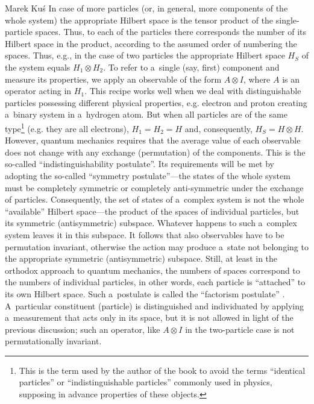\begin{newrevengenv}{Marek Kuś}
In case of more particles (or, in general, more components of the whole system) the appropriate Hilbert space is the tensor product of the single-particle spaces. Thus, to each of the particles there corresponds the number of its Hilbert space in the product, according to the assumed order of numbering the spaces. Thus, e.g., in the case of two particles the appropriate Hilbert space $H_S$ of the system equals $H_1 \otimes H_2$. To refer to a~single (say, first) component and measure its properties, we apply an observable of the form $A \otimes I$, where $A$ is an operator acting in $H_1$. This recipe works well when we deal with distinguishable particles possessing different physical properties, e.g. electron and proton creating a~binary system in a~hydrogen atom. But when all particles are of the same type\footnote{This is the term used by the author of the book to avoid the terms ``identical particles'' or ``indistinguishable particles'' commonly used in physics, supposing in advance properties of these objects.} (e.g. they are all electrons), $H_1 = H_2 = H$ and, consequently, $H_S  = H \otimes H$. However, quantum mechanics requires that the average value of each observable does not change with any exchange (permutation) of the components. This is the so-called ``indistinguishability postulate''. Its requirements will be met by adopting the so-called ``symmetry postulate''—the states of the whole system must be completely symmetric or completely anti-symmetric under the exchange of particles. Consequently, the set of states of a~complex system is not the whole ``available'' Hilbert space—the product of the spaces of individual particles, but its symmetric (antisymmetric) subspace. Whatever happens to such a~complex system leaves it in this subspace. It follows that also observables have to be permutation invariant, otherwise the action may produce a~state not belonging to the appropriate symmetric (antisymmetric) subspace. Still, at least in the orthodox approach to quantum mechanics, the numbers of spaces correspond to the numbers of individual particles, in other words, each particle is ``attached'' to its own Hilbert space. Such a~postulate is called the ``factorism postulate''
\parencite[][]{caulton_qualitative_2014}. %
 A~particular constituent (particle) is distinguished and individuated by applying a~measurement that acts only in its space, but it is not allowed in light of the previous discussion; such an operator, like $A \otimes I$ in the two-particle case is not permutationally invariant.


\end{newrevengenv}
